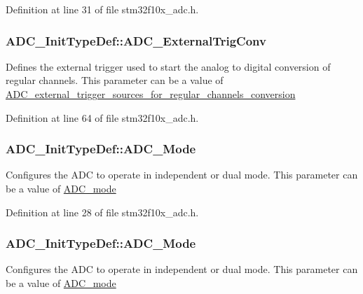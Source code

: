 Definition at line 31 of file stm32f10x\+\_\+adc.\+h.

\subsubsection[{\texorpdfstring{A\+D\+C\+\_\+\+External\+Trig\+Conv}{ADC_ExternalTrigConv}}]{ A\+D\+C\+\_\+\+Init\+Type\+Def\+::\+A\+D\+C\+\_\+\+External\+Trig\+Conv}\hypertarget{struct_a_d_c___init_type_def_ae5d0c48e70c2a39355b7ab0cc1df8310}{}\label{struct_a_d_c___init_type_def_ae5d0c48e70c2a39355b7ab0cc1df8310}
Defines the external trigger used to start the analog to digital conversion of regular channels. This parameter can be a value of \hyperlink{group___a_d_c__external__trigger__sources__for__regular__channels__conversion}{A\+D\+C\+\_\+external\+\_\+trigger\+\_\+sources\+\_\+for\+\_\+regular\+\_\+channels\+\_\+conversion} 

Definition at line 64 of file stm32f10x\+\_\+adc.\+h.

\subsubsection[{\texorpdfstring{A\+D\+C\+\_\+\+Mode}{ADC_Mode}}]{ A\+D\+C\+\_\+\+Init\+Type\+Def\+::\+A\+D\+C\+\_\+\+Mode}\hypertarget{struct_a_d_c___init_type_def_a16d43a4aad5a8e32d7f628e29b07efa6}{}\label{struct_a_d_c___init_type_def_a16d43a4aad5a8e32d7f628e29b07efa6}
Configures the A\+DC to operate in independent or dual mode. This parameter can be a value of \hyperlink{group___a_d_c__mode}{A\+D\+C\+\_\+mode} 

Definition at line 28 of file stm32f10x\+\_\+adc.\+h.

\subsubsection[{\texorpdfstring{A\+D\+C\+\_\+\+Mode}{ADC_Mode}}]{ A\+D\+C\+\_\+\+Init\+Type\+Def\+::\+A\+D\+C\+\_\+\+Mode}\hypertarget{struct_a_d_c___init_type_def_a0f9ec17ad585d66a54625213062c9260}{}\label{struct_a_d_c___init_type_def_a0f9ec17ad585d66a54625213062c9260}
Configures the A\+DC to operate in independent or dual mode. This parameter can be a value of \hyperlink{group___a_d_c__mode}{A\+D\+C\+\_\+mode} 

